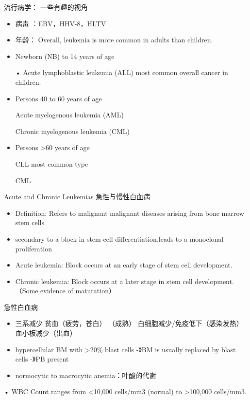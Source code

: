 \documentclass[
  ignorenonframetext,
]{beamer}
\begin{document}
\begin{frame}
\begin{block}{流行病学： 一些有趣的视角}
\protect\hypertarget{ux6d41ux884cux75c5ux5b66-ux4e00ux4e9bux6709ux8da3ux7684ux89c6ux89d2}{}
\begin{itemize}
\item
  病毒 ：EBV，HHV-8，HLTV
\item
  年龄： Overall, leukemia is more common in adults than children.
\item
  Newborn (NB) to 14 years of age

  • Acute lymphoblastic leukemia (ALL) most common overall cancer in
  children.
\item
  Persons 40 to 60 years of age

  Acute myelogenous leukemia (AML)

  Chronic myelogenous leukemia (CML)
\item
  Persons \textgreater60 years of age

  CLL most common type

  CML
\end{itemize}
\end{block}
\end{frame}

\begin{frame}
\begin{block}{Acute and Chronic Leukemias 急性与慢性白血病}
\protect\hypertarget{acute-and-chronic-leukemias-ux6025ux6027ux4e0eux6162ux6027ux767dux8840ux75c5}{}
\begin{itemize}
\item
  Definition: Refers to malignant malignant diseases arising from bone
  marrow stem cells
\item
  secondary to a block in stem cell differentiation,leads to a
  monoclonal proliferation
\item
  Acute leukemia: Block occurs at an early stage of stem cell
  development.
\item
  Chronic leukemia: Block occurs at a later stage in stem cell
  development.（Some evidence of maturation）
\end{itemize}
\end{block}
\end{frame}

\begin{frame}
\begin{block}{急性白血病}
\protect\hypertarget{ux6025ux6027ux767dux8840ux75c5}{}
\begin{itemize}
\item
  三系减少 贫血（疲劳，苍白） （成熟）
  白细胞减少/免疫低下（感染发热）血小板减少（出血）
\item
  hypercellular BM with \textgreater20\% blast cells -》BM is usually
  replaced by blast cells -》PB present
\item
  normocytic to macrocytic anemia：叶酸的代谢
\end{itemize}

• WBC Count ranges from \textless10,000 cells/mm3 (normal) to
\textgreater100,000 cells/mm3.
\end{block}
\end{frame}
\end{document}
